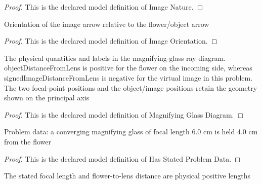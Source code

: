 \begin{proof}
  This is the declared model definition of Image Nature.
\end{proof}
\begin{definition}
  \label{def:physics:phyx-mini-0052:phyxminiproblems-problemphyxmini0052-imageorientation}
  Orientation of the image arrow relative to the flower/object arrow
\end{definition}
\begin{proof}
  This is the declared model definition of Image Orientation.
\end{proof}
\begin{definition}
  \label{def:physics:phyx-mini-0052:phyxminiproblems-problemphyxmini0052-magnifyingglassdiagram}
  The physical quantities and labels in the magnifying-glass ray diagram. objectDistanceFromLens is positive for the flower on the incoming side, whereas signedImageDistanceFromLens is negative for the virtual image in this problem. The two focal-point positions and the object/image positions retain the geometry shown on the principal axis
\end{definition}
\begin{proof}
  This is the declared model definition of Magnifying Glass Diagram.
\end{proof}
\begin{definition}
  \label{def:physics:phyx-mini-0052:phyxminiproblems-problemphyxmini0052-hasstatedproblemdata}
  Problem data: a converging magnifying glass of focal length 6.0 cm is held 4.0 cm from the flower
\end{definition}
\begin{proof}
  This is the declared model definition of Has Stated Problem Data.
\end{proof}
\begin{definition}
  \label{def:physics:phyx-mini-0052:phyxminiproblems-problemphyxmini0052-haspositiveproblemlengths}
  The stated focal length and flower-to-lens distance are physical positive lengths
\end{definition}
